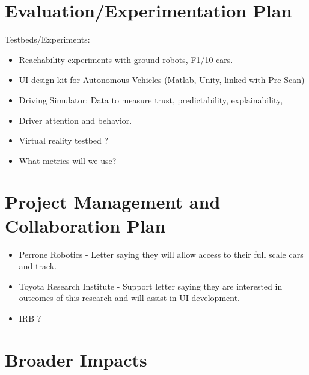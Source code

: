 \section{Evaluation/Experimentation Plan}
Testbeds/Experiments:
\begin{itemize}
    \item Reachability experiments with ground robots, F1/10 cars.
    \item UI design kit for Autonomous Vehicles (Matlab, Unity, linked with Pre-Scan)
    \item Driving Simulator: Data to measure trust, predictability, explainability, 
    \item Driver attention and behavior.
    \item Virtual reality testbed ?
    \item What metrics will we use?
\end{itemize}


\section{Project Management and Collaboration Plan}
\begin{itemize}
    \item Perrone Robotics - Letter saying they will allow access to their full scale cars and track.
    \item Toyota Research Institute - Support letter saying they are interested in outcomes of this research and will assist in UI development. 
    \item IRB ?
\end{itemize}
\section{Broader Impacts}

